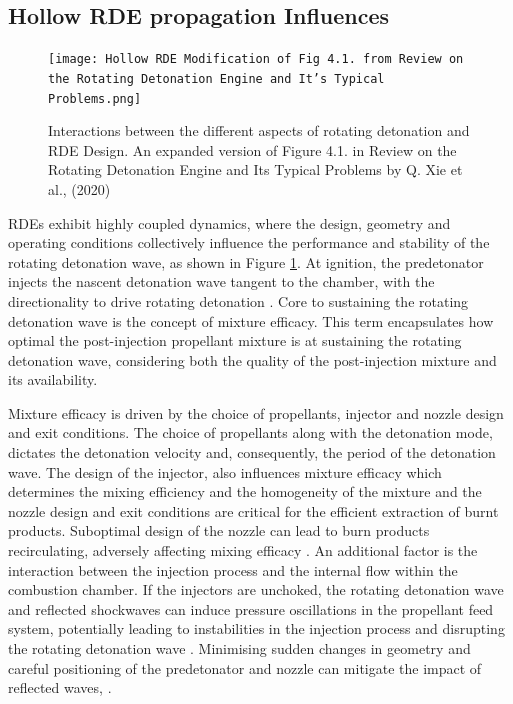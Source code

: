 \documentclass{article}
\begin{document}
\subsection{Hollow RDE propagation Influences}\label{Hollow RDE propagation Influences}

\begin{figure}
\centering
\texttt{[image: Hollow RDE Modification of Fig 4.1. from Review on the Rotating Detonation Engine and It’s Typical Problems.png]}
\caption{Interactions between the different aspects of rotating detonation and RDE Design. An expanded version of Figure 4.1. in Review on the Rotating Detonation Engine and Its Typical Problems by Q. Xie et al., (2020) \cite{Xie2020} }\label{Fig.6}
\end{figure}

RDEs exhibit highly coupled dynamics, where the design, geometry and operating conditions collectively influence the performance and stability of the rotating detonation wave, as shown in Figure \ref{Fig.6}. At ignition, the predetonator injects the nascent detonation wave tangent to the chamber, with the directionality to drive rotating detonation \cite{Zhang2017}. Core to sustaining the rotating detonation wave is the concept of mixture efficacy. This term encapsulates how optimal the post-injection propellant mixture is at sustaining the rotating detonation wave, considering both the quality of the post-injection mixture and its availability. 

Mixture efficacy is driven by the choice of propellants, injector and nozzle design and exit conditions. The choice of propellants along with the detonation mode, dictates the detonation velocity and, consequently, the period of the detonation wave. The design of the injector, also influences mixture efficacy which determines the mixing efficiency and the homogeneity of the mixture \cite{Gaillard2015} and the nozzle design and exit conditions are critical for the efficient extraction of burnt products. Suboptimal design of the nozzle can lead to burn products recirculating, adversely affecting mixing efficacy \cite{Wang2019}.
An additional factor is the interaction between the injection process and the internal flow within the combustion chamber. If the injectors are unchoked, the rotating detonation wave and reflected shockwaves can induce pressure oscillations in the propellant feed system, potentially leading to instabilities in the injection process and disrupting the rotating detonation wave \cite{Sada2022}. Minimising sudden changes in geometry and careful positioning of the predetonator and nozzle can mitigate the impact of reflected waves, \cite{Wang2019,1Zhang2021}.
\end{document}
